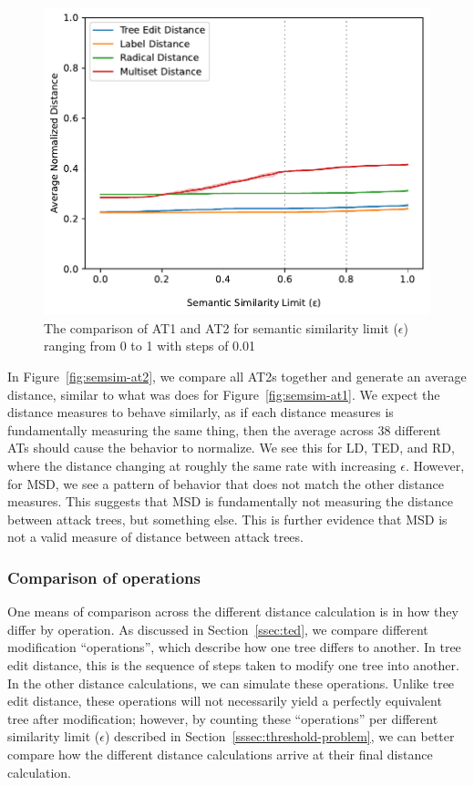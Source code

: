 \begin{figure}
    \includegraphics[width=\linewidth]{code/img/similaritylimits_at1-2_percentage.pdf}
    \caption{The comparison of AT1 and AT2 for semantic similarity limit ($\epsilon$) ranging from 0 to 1 with steps of 0.01}
    \label{fig:semsim-at1-2}
\end{figure}

In Figure~\ref{fig:semsim-at2}, we compare all AT2s together and generate an average distance, similar to what was does for Figure~\ref{fig:semsim-at1}. We expect the distance measures to behave similarly, as if each distance measures is fundamentally measuring the same thing, then the average across 38 different ATs should cause the behavior to normalize. We see this for LD, TED, and RD, where the distance changing at roughly the same rate with increasing $\epsilon$. However, for MSD, we see a pattern of behavior that does not match the other distance measures. This suggests that MSD is fundamentally not measuring the distance between attack trees, but something else. This is further evidence that MSD is not a valid measure of distance between attack trees.

\subsubsection{Comparison of operations}

One means of comparison across the different distance calculation is in how they differ by operation. As discussed in Section~\ref{ssec:ted}, we compare different modification ``operations'', which describe how one tree differs to another. In tree edit distance, this is the sequence of steps taken to modify one tree into another. In the other distance calculations, we can simulate these operations. Unlike tree edit distance, these operations will not necessarily yield a perfectly equivalent tree after modification; however, by counting these ``operations'' per different similarity limit ($\epsilon$) described in Section~\ref{sssec:threshold-problem}, we can better compare how the different distance calculations arrive at their final distance calculation.

